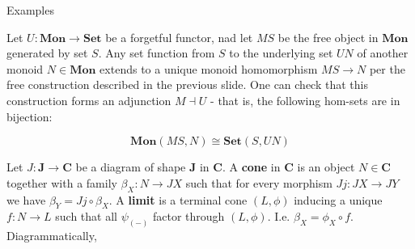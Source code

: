 \documentclass[tikz]{beamer}
\theoremstyle{definition}
\newcommand{\cat}[1]{\mathbf{#1}}
\begin{document}
\begin{frame}{Examples}

Let $U: \cat{Mon} \to \cat{Set}$ be a forgetful functor, nad let $MS$ be the free object in $\cat{Mon}$ generated by set $S$. Any set function from $S$ to the underlying set $UN$ of another monoid $N \in \cat{Mon}$ extends to a unique monoid homomorphism $MS \to N$ per the free construction described in the previous slide. One can check that this construction forms an adjunction $ M \dashv U$ - that is, the following hom-sets are in bijection:

\begin{center}
    \begin{equation*}
        \cat{Mon}(MS, N) \cong \cat{Set}(S, UN)
    \end{equation*}{}
\end{center}

\end{frame}

\begin{frame}[fragile]

Let $J: \cat{J} \to \cat{C}$ be a diagram of shape $\cat{J}$ in $\cat{C}$. A \textbf{cone} in $\cat{C}$ is an object $N \in \cat{C}$ together with a family $\beta_X: N \to JX$ such that for every morphism $Jj: JX \to JY$ we have $\beta_Y = Jj \circ \beta_X$. A \textbf{limit} is a terminal cone $(L, \phi)$ inducing a unique $f: N \to L$ such that all $\psi_{(-)}$ factor through $(L, \phi)$. I.e. $\beta_X = \phi_X \circ f$. Diagrammatically, 

\begin{center}
    {}
\end{center}{}
    
\end{frame}
\end{document}
